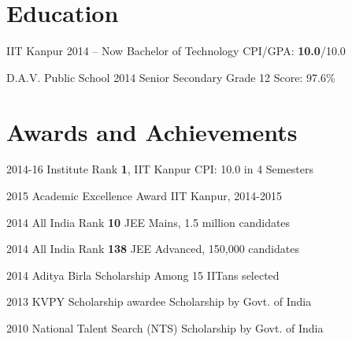 \documentclass{tccv}
\begin{document}
\vspace{-0.1cm}
\section{Education}

\begin{yearlist}

\item[IIT Kanpur]{\small{2014 -- Now}}
  {Bachelor of Technology}
  {CPI/GPA: \textbf{10.0}/10.0}

\item[D.A.V. Public School]{\small{2014}}
  {Senior Secondary Grade 12}
  {Score: 97.6\%}

\end{yearlist}

\vspace{-0.7cm}
\section{Awards and Achievements}

\begin{yearlist}

\item{\small{2014-16}}
  {Institute Rank \textbf{1}, IIT Kanpur}
  {\small{CPI: 10.0 in 4 Semesters}}

\item{\small{2015}}
  {Academic Excellence Award}
  {\small{IIT Kanpur, 2014-2015}}

\item{\small{2014}}
  {All India Rank \textbf{10}}
  {\small{JEE Mains, 1.5 million candidates}}

\item {\small{2014}}
  {All India Rank \textbf{138}}
  {\small{JEE Advanced, 150,000 candidates}}

\item {\small{2014}}
  {Aditya Birla Scholarship}
  {\small{Among 15 IITans selected}}

\item {\small{2013}}
  {KVPY Scholarship awardee}
  {\small{Scholarship by Govt. of India}}

\item {\small{2010}}
  {National Talent Search (NTS)}
  {\small{Scholarship by Govt. of India}}

\end{yearlist}

\vspace{-0.6cm}
\end{document}
